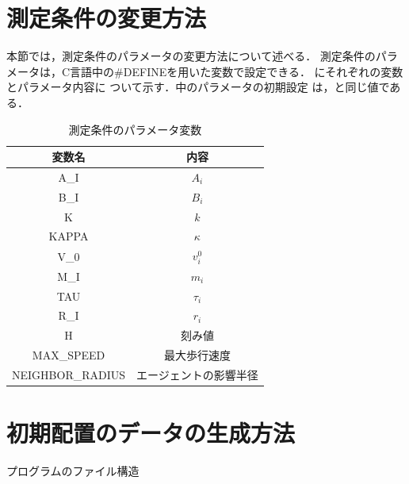 \clearpage
\section{測定条件の変更方法}
本節では，測定条件のパラメータの変更方法について述べる．
測定条件のパラメータは，C言語中の\#DEFINEを用いた変数で設定できる．
にそれぞれの変数とパラメータ内容に
ついて示す．中のパラメータの初期設定
は，と同じ値である．


\begin{table}[t]
  \begin{center}
    \caption{測定条件のパラメータ変数}
    \label{tb:parameter_settings}
    \begin{tabular}{c|c}
      \hline \hline
      変数名 & 内容 \\ \hline
      A\_I & $A_i$ \\ \hline
      B\_I & $B_i$ \\ \hline 
      K   & $k$   \\ \hline 
      KAPPA & $\kappa$  \\ \hline 
      V\_0 & $v_i^0$     \\ \hline 
      M\_I & $m_i$       \\ \hline 
      TAU & $\tau_i$    \\ \hline 
      R\_I & $r_i$       \\ \hline 
      H   & 刻み値 \\ \hline
      MAX\_SPEED & 最大歩行速度 \\ \hline
      NEIGHBOR\_RADIUS & エージェントの影響半径 \\ \hline

    \end{tabular}
  \end{center}
\end{table}

\section{初期配置のデータの生成方法}

\begin{itembox}[l]{プログラムのファイル構造}
\end{itembox}

